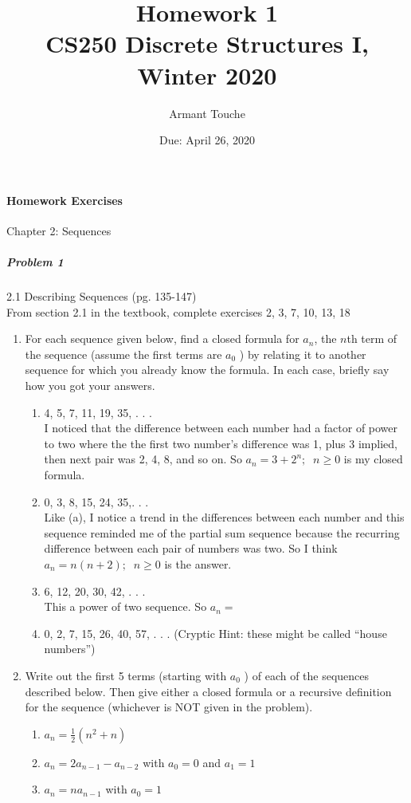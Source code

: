 \documentclass[11pt, a4paper]{article}
\title{\bf Homework 1\\[1ex]
\rm\normalsize CS250 Discrete Structures I, Winter 2020 }
\date{\normalsize Due: April 26, 2020}
\author{\normalsize Armant Touche}
\newcommand\setItemNumber[1]{\setcounter{enumi}{\numexpr#1-1\relax}}
\begin{document}
 
\vspace{0cm}\maketitle 
	\paragraph{Homework Exercises} Chapter 2: Sequences
	
	\subparagraph{Problem 1} 2.1 Describing Sequences (pg. 135-147)\\
			
		From section 2.1 in the textbook, complete exercises 2, 3, 7, 10, 13, 18

        \begin{enumerate}

            \setItemNumber{2}
            \item For each sequence given below, find a closed formula for $a_n$, the $n$th term of the sequence (assume the first terms are $a_0$ ) by relating it to another sequence for which you already know the formula. In each case, briefly say how you got your answers.
                \begin{enumerate}
                    \item 4, 5, 7, 11, 19, 35, . . .\\
                        I noticed that the difference between each number had a factor of power to two where the the first two number's difference was 1, plus 3 implied, then next pair was 2, 4, 8, and so on. So $a_n = 3 + 2^n;\;\;n\geq 0$ is my closed formula.
                    \item 0, 3, 8, 15, 24, 35,. . .\\
                        Like (a), I notice a trend in the differences between each number and this sequence reminded me of the partial sum sequence because the recurring difference between each pair of numbers was two. So I think $a_n = n(n + 2);\;\;n\geq 0$ is the answer.
                    \item 6, 12, 20, 30, 42, . . .\\
                        This a power of two sequence. So $a_n = $
                    \item 0, 2, 7, 15, 26, 40, 57, . . . (Cryptic Hint: these might be called “house numbers”)
                \end{enumerate}

            \item Write out the first 5 terms (starting with $a_0$ ) of each of the sequences described below. Then give either a closed formula or a recursive definition for the sequence (whichever is NOT given in the problem).
                \begin{enumerate}
                    \item $a_n = \frac{1}{2}(n^2 + n)$  
                    \item $a_n = 2a_{n - 1} - a_{n - 2}$ with $a_0 = 0$ and $a_1 = 1$
                    \item $a_n = na_{n - 1}$ with $a_0 = 1$
                \end{enumerate}


\end{enumerate}
\end{document}
